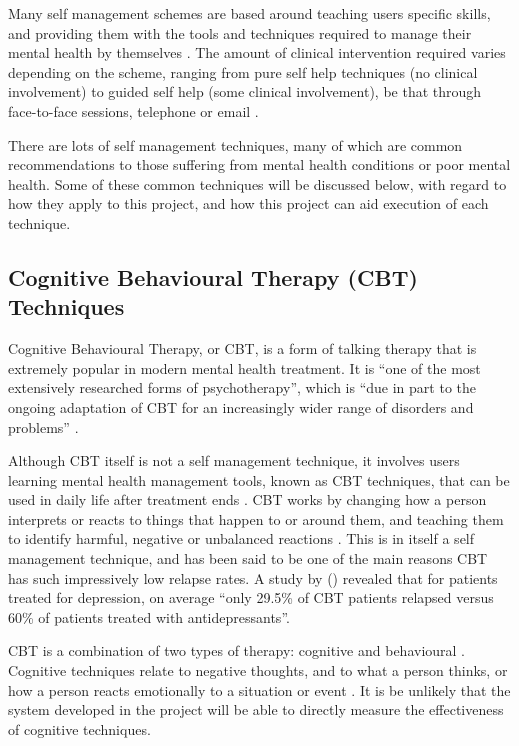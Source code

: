 \documentclass[11pt,openright,a4paper]{report}
\begin{document}
Many self management schemes are based around teaching users specific skills, and providing them with the tools and techniques required to manage their mental health by themselves \parencite{selfmanagementuk}. The amount of clinical intervention required varies depending on the scheme, ranging from pure self help techniques (no clinical involvement) to guided self help (some clinical involvement), be that through face-to-face sessions, telephone or email \parencite{selfhelpanxiety}.

There are lots of self management techniques, many of which are common recommendations to those suffering from mental health conditions or poor mental health. Some of these common techniques will be discussed below, with regard to how they apply to this project, and how this project can aid execution of each technique.

\subsection{Cognitive Behavioural Therapy (CBT) Techniques}
Cognitive Behavioural Therapy, or CBT, is a form of talking therapy that is extremely popular in modern mental health treatment. It is \enquote{one of the most extensively researched forms of psychotherapy}, which is \enquote{due in part to the ongoing adaptation of CBT for an increasingly
wider range of disorders and problems} \parencite{butler2006empirical}.

Although CBT itself is not a self management technique, it involves users learning mental health management tools, known as CBT techniques, that can be used in daily life after treatment ends \parencite{babcpcbt}. CBT works by changing how a person interprets or reacts to things that happen to or around them, and teaching them to identify harmful, negative or unbalanced reactions \parencite{nhscbt}. This is in itself a self management technique, and has been said to be one of the main reasons CBT has such impressively low relapse rates. A study by \citeauthor{butler2006empirical} (\citeyear{butler2006empirical}) revealed that for patients treated for depression, on average \enquote{only 29.5\% of CBT patients relapsed versus 60\% of patients treated with antidepressants}.

CBT is a combination of two types of therapy: cognitive and behavioural \parencite{patientcbt}. Cognitive techniques relate to negative thoughts, and to what a person thinks, or how a person reacts emotionally to a situation or event \parencite{medscapecbt}. It is be unlikely that the system developed in the project will be able to directly measure the effectiveness of cognitive techniques.
\end{document}

